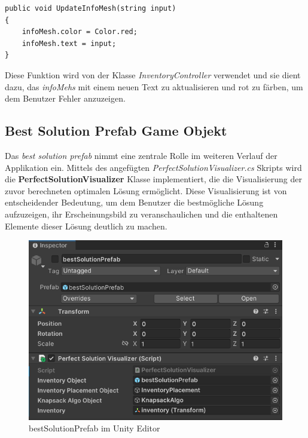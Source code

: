 \begin{lstlisting}[style=csharp, caption={Funktion um InfoMesh zu verändern}]
public void UpdateInfoMesh(string input)
{
    infoMesh.color = Color.red;
    infoMesh.text = input;
}
\end{lstlisting}
Diese Funktion wird von der Klasse \textit{InventoryController} verwendet und sie dient dazu, das \textit{infoMehs} mit
einem neuen Text zu aktualisieren und rot zu färben, um dem Benutzer Fehler anzuzeigen.

\subsection{Best Solution Prefab Game Objekt}
Das \textit{best solution prefab} nimmt eine zentrale Rolle im weiteren Verlauf der Applikation ein. Mittels des angefügten
\textit{PerfectSolutionVisualizer.cs} Skripts wird die \textbf{PerfectSolutionVisualizer} Klasse implementiert, die die
Visualisierung der zuvor berechneten optimalen Lösung ermöglicht. Diese Visualisierung ist von entscheidender Bedeutung,
um dem Benutzer die bestmögliche Lösung aufzuzeigen, ihr Erscheinungsbild zu veranschaulichen und die enthaltenen Elemente
dieser Lösung deutlich zu machen.
\begin{figure}[H]
    \centering
    \includegraphics[scale=0.8]{images/bestSolPref_Editor}
    \caption{bestSolutionPrefab im Unity Editor}
    \label{fig:bestSol_Editor}
\end{figure}

